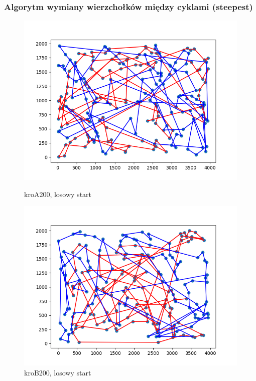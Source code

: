 \documentclass[11pt]{article}
\begin{document}
\subsubsection{Algorytm wymiany wierzchołków między cyklami (steepest)}
\begin{figure}[H]
    \centering
    \begin{minipage}[t]{0.45\textwidth}
        \centering
        \includegraphics[width=\linewidth]{best_paths/kroA200/traverse_steepest_shuffle/randomstart}
        \caption{kroA200, losowy start}
    \end{minipage}
    \hfill
    \begin{minipage}[t]{0.45\textwidth}
        \centering
        \includegraphics[width=\linewidth]{best_paths/kroB200/traverse_steepest_shuffle/randomstart}
        \caption{kroB200, losowy start}
    \end{minipage}


\end{figure}
\end{document}
